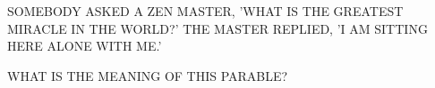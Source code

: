 SOMEBODY ASKED A ZEN MASTER, 'WHAT IS THE GREATEST MIRACLE
IN THE WORLD?' THE MASTER REPLIED, 'I AM SITTING HERE ALONE
WITH ME.'

WHAT IS THE MEANING OF THIS PARABLE?
